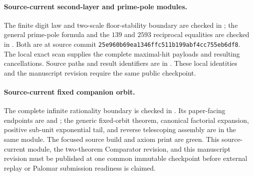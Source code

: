 \documentclass[11pt]{article}
\begin{document}
\paragraph{Source-current second-layer and prime-pole modules.}
The finite digit law and two-scale floor-stability boundary are checked in
; the general prime-pole formula and the $139$ and
$2593$ reciprocal equalities are checked in .
Both are at source commit
\texttt{25e960b69ea1346ffc511b199abf4cc755eb6df8}.  The local exact scan supplies
the complete maximal-hit payloads and resulting cancellations.  Source paths
and result identifiers are in .  These local
identities and the manuscript revision require the same public checkpoint.
\par
\medskip
\paragraph{Source-current fixed companion orbit.}
The complete infinite rationality boundary is checked in
.  Its paper-facing endpoints are
and
; the
generic fixed-orbit theorem, canonical factorial expansion, positive sub-unit
exponential tail, and reverse telescoping assembly are in the same module.
The focused source build and axiom print are green.  This source-current module,
the two-theorem Comparator revision, and this manuscript revision must be
published at one common immutable checkpoint before external replay or Palomar
submission readiness is claimed.
\par
\endgroup
\end{document}
